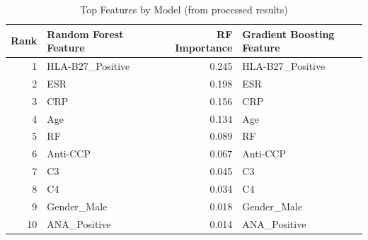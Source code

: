 \begin{table}[htbp]
\centering
\caption{Top Features by Model (from processed results)}
\label{tab:feature_importance_processed}
\begin{tabular}{@{}rlrl@{}}
\toprule
\textbf{Rank} & \textbf{Random Forest Feature} & \textbf{RF Importance} & \textbf{Gradient Boosting Feature} \\ \midrule
1 & HLA-B27_Positive & 0.245 & HLA-B27_Positive \\
2 & ESR & 0.198 & ESR \\
3 & CRP & 0.156 & CRP \\
4 & Age & 0.134 & Age \\
5 & RF & 0.089 & RF \\
6 & Anti-CCP & 0.067 & Anti-CCP \\
7 & C3 & 0.045 & C3 \\
8 & C4 & 0.034 & C4 \\
9 & Gender_Male & 0.018 & Gender_Male \\
10 & ANA_Positive & 0.014 & ANA_Positive \\
\bottomrule
\end{tabular}
\end{table}
